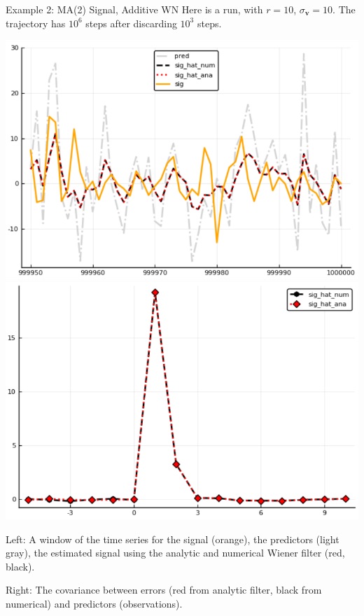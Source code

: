 \documentclass{beamer}  %
\begin{document}
\begin{frame}{Example 2: MA(2) Signal, Additive WN}
	Here is a run, with $r=10$, $\sigma_{\textbf{v}} = 10$. The trajectory has $10^6$ steps after discarding $10^3$ steps. 
	
	\includegraphics[scale=.33]{fig/figMA2_ts.png}
	\includegraphics[scale=.33]{fig/figMA2_cov.png}
	
	Left: A window of the time series for the signal (orange), the predictors (light gray), the estimated signal using the analytic and numerical Wiener filter (red, black). 
	
	Right: The covariance between errors (red from analytic filter, black from numerical) and predictors (observations). \\
\end{frame}


\end{document}
